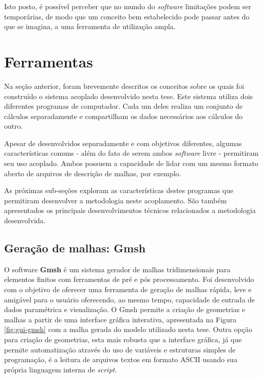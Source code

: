Isto posto, é possível perceber que no mundo do \textit{software} limitações podem ser temporárias, de modo que um
conceito bem estabelecido pode passar antes do que se imagina, a uma ferramenta de utilização ampla.

\section{Ferramentas}
\label{sec:ferr}

Na seção anterior, foram brevemente descritos os conceitos sobre os quais foi construído
o sistema acoplado desenvolvido nesta tese. Este
sistema utiliza dois diferentes programas de computador. Cada um deles
realiza um conjunto de cálculos separadamente e compartilham os dados necessários aos cálculos do outro.

Apesar de desenvolvidos separadamente e com objetivos diferentes, algumas características comuns - além
do fato de serem ambos \textit{software} livre - permitiram seu uso acoplado. Ambos possuem a capacidade de lidar
com um mesmo formato aberto de arquivos de descrição de malhas, por exemplo.


As próximas sub-seções exploram as características destes programas que permitiram desenvolver
a metodologia neste acoplamento. São também apresentados os principais desenvolvimentos técnicos
relacionados a metodologia desenvolvida.

\subsection{Geração de malhas: \textbf{Gmsh}}
\label{subsection:gmsh}

O software \textbf{Gmsh} \cite{Geuzane2009} é um sistema gerador de malhas tridimensionais
para elementos finitos com ferramentas de pré e pós processamento. Foi desenvolvido com o objetivo
de oferecer uma ferramenta de geração de malhas rápida, leve e amigável para o usuário oferecendo,
ao mesmo tempo, capacidade de entrada de dados paramétrica e visualização. O Gmsh permite
a criação de geometrias e malhas a partir de uma interface gráfica interativa, apresentada
na Figura \ref{fig:gui-gmsh} com a malha gerada do modelo utilizado nesta tese. Outra opção
para criação de geometrias, esta mais robusta que a interface gráfica, já que permite
automatização através do uso de variáveis e estruturas simples de programação, é a leitura
de arquivos textos em formato ASCII usando sua própria linguagem interna de \textit{script}.

